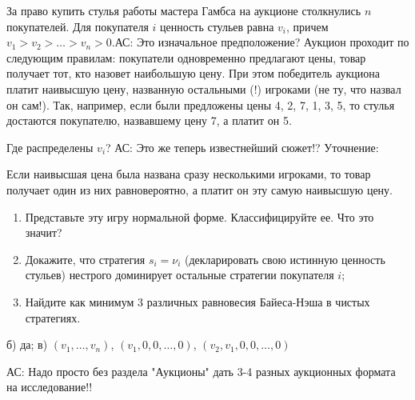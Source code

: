 \begin{problem}
За право купить стулья работы мастера Гамбса на аукционе столкнулись  $n$ покупателей. Для покупателя  $i$ ценность стульев равна  $v_{i} $, причем  $v_{1} >v_{2} >\ldots >v_{n} >0$.{\red АС: Это изначальное предположение?} Аукцион проходит по следующим правилам: покупатели одновременно предлагают цены, товар получает тот, кто назовет наибольшую цену. При этом победитель аукциона платит наивысшую цену, названную остальными (!) игроками (не ту, что назвал он сам!). Так, например, если были предложены цены 4, 2, 7, 1, 3, 5, то стулья достаются покупателю, назвавшему цену 7, а платит он 5.\par
{\red Где распределены $v_i$?}
{\red АС: Это же теперь известнейший сюжет!?}
Уточнение: \par
Если наивысшая цена была названа сразу несколькими игроками, то товар получает один из них равновероятно, а платит он эту самую наивысшую цену. \par
\begin{enumerate}
\item Представьте эту игру нормальной форме. Классифицируйте ее. {\red Что это значит?}\par
\item Докажите, что стратегия  $s_{i} =\nu _{i} $  (декларировать свою истинную ценность стульев)  нестрого доминирует остальные стратегии покупателя $i$;\par
\item  Найдите как минимум 3 различных равновесия Байеса-Нэша в чистых стратегиях.
\end{enumerate}


\begin{sol}
б) да; в) $(v_{1},\ldots, v_{n})$, $(v_{1},0,0,\ldots,0)$, $(v_{2},v_{1},0,0,\ldots,0)$
\end{sol}
\end{problem}


{\red АС: Надо просто без раздела "Аукционы" дать 3-4 разных аукционных формата на исследование!!}

